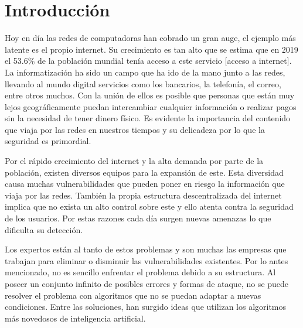 \chapter*{Introducción}\label{chapter:introduction}




Hoy en día las redes de computadoras han cobrado un gran auge, el ejemplo más latente es el propio internet. Su crecimiento es tan alto que se estima que en 2019 el 53.6\% de la población mundial tenía acceso a este servicio [acceso a internet]. La informatización ha sido un campo que ha ido de la mano junto a las redes, llevando al mundo digital servicios como los bancarios, la telefonía, el correo, entre otros muchos. Con la unión de ellos es posible que personas que están muy lejos geográficamente puedan intercambiar cualquier información o realizar pagos sin la necesidad de tener dinero físico. Es evidente la importancia del contenido que viaja por las redes en nuestros tiempos y su delicadeza por lo que la seguridad es primordial.

Por el rápido crecimiento del internet y la alta demanda por parte de la población, existen diversos equipos para la expansión de este. Esta diversidad causa muchas vulnerabilidades que pueden poner en riesgo la información que viaja por las redes. También la propia estructura descentralizada del internet implica que no exista un alto control sobre este y ello atenta contra la seguridad de los usuarios. Por estas razones cada día surgen nuevas amenazas lo que dificulta su detección.

Los expertos están al tanto de estos problemas y son muchas las empresas que trabajan para eliminar o disminuir las vulnerabilidades existentes. Por lo antes mencionado, no es sencillo enfrentar el problema debido a su estructura. Al poseer un conjunto infinito de posibles errores y formas de ataque, no se puede resolver el problema con algoritmos que no se puedan adaptar a nuevas condiciones. Entre las soluciones, han surgido ideas que utilizan los algoritmos más novedosos de inteligencia artificial.

